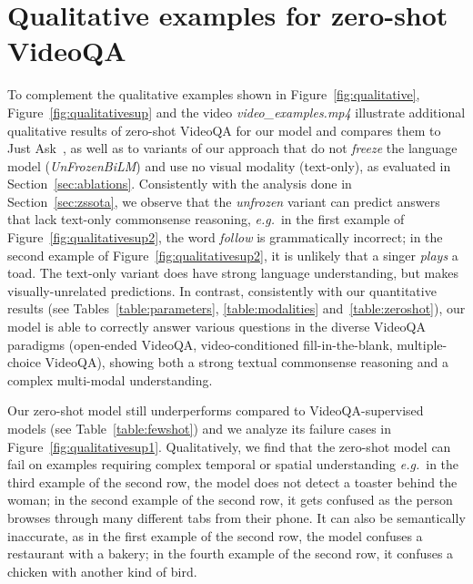 \section{Qualitative examples for zero-shot VideoQA}\label{sec:addquali}
To complement the qualitative examples shown in Figure~\ref{fig:qualitative}, Figure~\ref{fig:qualitativesup} and the video \textit{video\_examples.mp4} illustrate additional qualitative results of zero-shot VideoQA for our \model{} model and compares them to Just Ask~\cite{Yang2022LearningTA}, as well as to variants of our approach that do not \textit{freeze} the language model (\textit{UnFrozenBiLM}) and use no visual modality (text-only), as evaluated in Section~\ref{sec:ablations}.
Consistently with the analysis done in Section~\ref{sec:zssota}, we observe that the \textit{unfrozen} variant can predict answers that lack text-only commonsense reasoning, \textit{e.g.}~in the first example of Figure~\ref{fig:qualitativesup2}, the word \textit{follow} is grammatically incorrect; in the second example of Figure~\ref{fig:qualitativesup2}, it is unlikely that a singer \textit{plays} a toad.
The text-only variant does have strong language understanding, but makes visually-unrelated predictions.
In contrast, consistently with our quantitative results (see Tables~\ref{table:parameters}, \ref{table:modalities} and~\ref{table:zeroshot}), our model \model{} is able to correctly answer various questions in the diverse VideoQA paradigms (open-ended VideoQA, video-conditioned fill-in-the-blank, multiple-choice VideoQA), showing both a strong textual commonsense reasoning and a complex multi-modal understanding. 

Our zero-shot model still underperforms compared to VideoQA-supervised models (see Table~\ref{table:fewshot}) and we analyze its failure cases in Figure~\ref{fig:qualitativesup1}.
Qualitatively, we find that the zero-shot model can fail on examples requiring complex temporal or spatial understanding \textit{e.g.}~in the third example of the second row, the model does not detect a toaster behind the woman; in the second example of the second row, it gets confused as the person browses through many different tabs from their phone.
It can also be semantically inaccurate, as in the first example of the second row, the model confuses a restaurant with a bakery; in the fourth example of the second row, it confuses a chicken with another kind of bird.


